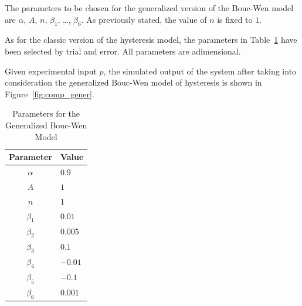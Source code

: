 \begin{minipage}[ht]{0.6\textwidth}
	\vspace*{-2cm}
	The parameters to be chosen for the generalized version of the Bouc-Wen model
	are $\alpha$, $A$, $n$, $\beta_1$, \ldots, $\beta_6$. 
	As previously stated, the value of $n$ is fixed to $1$.
	
	As for the classic version of the hysteresis model, the parameters
	in Table~\ref{tab:gener_param} have been selected by trial and error.
	All parameters are adimensional.
	
	Given experimental input $p$, the simulated output of the system
	after taking into consideration the generalized Bouc-Wen model of hysteresis
	is shown in Figure~\ref{fig:comp_gener}.
\end{minipage}
\hfill
\begin{minipage}{0.35\textwidth}
	\vspace*{-0.5cm}
	\begin{table}[H]
		\centering
		\begin{tabular}{@{}cl@{}}
			\toprule
			\textbf{Parameter} & \textbf{Value} \\ \midrule
			$\alpha$           & $0.9$          \\
			$A$                & $1$          	\\
			$n$   		       & $1$        	\\
			$\beta_1$          & $0.01$       	\\
			$\beta_2$          & $0.005$       	\\
			$\beta_3$          & $0.1$       	\\
			$\beta_4$          & $-0.01$       	\\
			$\beta_5$          & $-0.1$       	\\
			$\beta_6$          & $0.001$       	\\ \bottomrule
		\end{tabular}
		\caption{Parameters for the Generalized Bouc-Wen Model}
		\label{tab:gener_param}
	\end{table}
\end{minipage}

